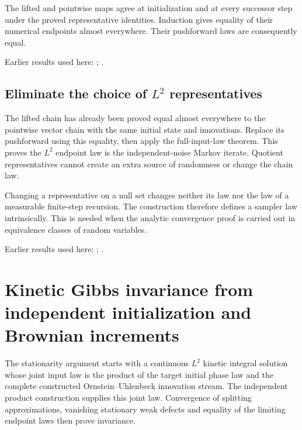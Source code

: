 \documentclass[11pt,a4paper]{report}
\begin{document}
The lifted and pointwise maps agree at initialization and at every successor step under the proved representative identities. Induction gives equality of their numerical endpoints almost everywhere. Their pushforward laws are consequently equal.



Earlier results used here: \cite[Section~3.20.1]{LangevinLean2026ULASC}; \cite[Section~3.20.3]{LangevinLean2026ULASC}.
\subsection{\texorpdfstring{Eliminate the choice of \(L^{2}\) representatives}{Eliminate the choice of L² representatives}}
\label{report-step-KineticLangevin-SplittingLaw-lean-3}


The lifted chain has already been proved equal almost everywhere to the pointwise vector chain with the same initial state and innovations. Replace its pushforward using this equality, then apply the full-input-law theorem. This proves the \(L^{2}\) endpoint law is the independent-noise Markov iterate. Quotient representatives cannot create an extra source of randomness or change the chain law.



Changing a representative on a null set changes neither its law nor the law of a measurable finite-step recursion. The construction therefore defines a sampler law intrinsically. This is needed when the analytic convergence proof is carried out in equivalence classes of random variables.



Earlier results used here: \cite[Section~3.13.2]{LangevinLean2026ULASC}; \cite[Section~3.33.6]{LangevinLean2026ULASC}.
\section{\texorpdfstring{Kinetic Gibbs invariance from independent initialization and Brownian increments}{Kinetic Gibbs invariance from independent initialization and Brownian increments}}
\label{proof-module-KineticLangevin-StationarityTransfer-lean}


The stationarity argument starts with a continuous \(L^{2}\) kinetic integral solution whose joint input law is the product of the target initial phase law and the complete constructed Ornstein–Uhlenbeck innovation stream. The independent product construction supplies this joint law. Convergence of splitting approximations, vanishing stationary weak defects and equality of the limiting endpoint laws then prove invariance.
\end{document}
